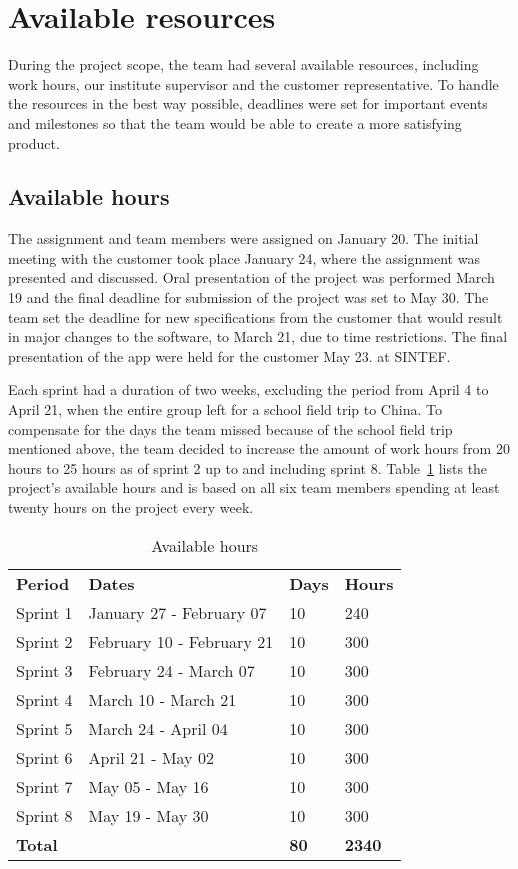 \newpage
\section{Available resources}
\label{sec:availResources}
During the project scope, the team had several available resources, including work hours, our institute supervisor and the customer representative. To handle the resources in the best way possible, deadlines were set for important events and milestones so that the team would be able to create a more satisfying product.


\subsection{Available hours}
The assignment and team members were assigned on January 20. The initial meeting with the customer took place January 24, where the assignment was presented and discussed. Oral presentation of the project was performed March 19 and the final deadline for submission of the project was set to May 30. The team set the deadline for new specifications from the customer that would result in major changes to the software, to March 21, due to time restrictions. The final presentation of the app were held for the customer May 23. at SINTEF.

Each sprint had a duration of two weeks, excluding the period from April 4 to April 21, when the entire group left for a school field trip to China. To compensate for the days the team missed because of the school field trip mentioned above, the team decided to increase the amount of work hours from 20 hours to 25 hours as of sprint 2 up to and including sprint 8. Table~\ref{tab:availHours} lists the project's available hours and is based on all six team members spending at least twenty hours on the project every week.


\begin{table}[H]
\centering
{}
\begin{tabular}{|l|l|l|l|}
\hline
\textbf{Period} & \textbf{Dates} & \textbf{Days} & \textbf{Hours}\\
Sprint 1& January 27 - February 07 & 10  & 240 \\
Sprint 2 & February 10 - February 21 &10  & 300 \\
Sprint 3 & February 24 - March 07 &10 & 300 \\
Sprint 4 & March 10 - March 21 &10  &300 \\
Sprint 5 & March 24 - April 04 &10&  300 \\
Sprint 6 & April 21 - May 02 &10  &300 \\
Sprint 7 & May 05 - May 16 &10  &300 \\
Sprint 8 & May 19 - May 30 &10  &300 \\
\textbf{Total}&& \textbf{80}&  \textbf{2340}\\\hline
\end{tabular}
\caption{Available hours}
\label{tab:availHours}
\end{table}


